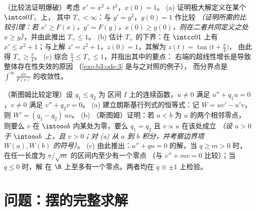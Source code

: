 \begin{exercise}[$\star\star$]\label{exo:b3:ode:11}
（比较法证明爆破）考虑 $x' = x^2 + t^2$，$x(0) =
1$。
(a) 证明极大解定义在某个 $\intco0{T_+}$ 上，
其中 $T_+ < \infty$：与 $y' = y^2$，$y(0) = 1$ 作比较
\emph{（证明所需的比较引理：若 $x' \geq
F(x)$，$y' = F(y)$，$x(0) \geq y(0)$，则在二者共同定义之处 $x \geq
y$）}，并由此推出 $T_+ \leq 1$。
(b) 估计 $T_+$ 的下界：在 $\intcc01$ 上有 $x' \leq x^2 +
1$；与上解 $z' = z^2 + 1$，$z(0) =
1$，其解为 $z(t) = \tan\bigl(t + \frac\pi4\bigr)$，
由此得 $T_+ \geq \frac\pi4$。
(c) 综合 $\frac\pi4 \leq T_+ \leq 1$，并指出其中的要点：
右端的超线性增长是导致整体存在性失效的原因
（\cref{exo:b3:ode:3} 是与之对照的例子），
而分界点是
$\int^{\infty}\frac{\dd s}{F(s)}$ 的收敛性。
\end{exercise}

\begin{exercise}[$\star\star\star$]\label{exo:b3:ode:12}
（斯图姆比较定理）设 $q_1 \leq q_2$ 为
区间 $I$ 上的连续函数，$u \neq 0$ 满足 $u''
+ q_1u = 0$，$v \neq 0$ 满足 $v'' + q_2v = 0$。
(a) 建立朗斯基行列式的恒等式：记 $W = uv' - u'v$，
则 $W' = (q_1 - q_2)\,uv$。
(b) （斯图姆）证明：若 $a < b$ 为 $u$ 的两个相邻零点，
则要么 $v$ 在 $\intoo ab$ 内某处为零，要么
$q_1 = q_2$ 且 $v \propto u$ 在该处成立 \emph{（设 $u > 0$
于 $\intoo ab$ 上，且 $v > 0$；对 (a) 从 $a$ 到
$b$ 积分，并考察边界项 $W(a),
W(b)$ 的符号）}。
(c) 由此推出：$u'' + qu = 0$ 的解，当 $q \geq m > 0$ 时，
在任一长度为 $\pi/\sqrt m$ 的区间内至少有一个零点
（与 $v'' + mv = 0$ 比较）；当 $q \leq 0$ 时，解
在 $\R$ 上至多有一个零点。两者均在
$q \equiv \pm1$ 上检验。
\end{exercise}

\section{问题：摆的完整求解}

